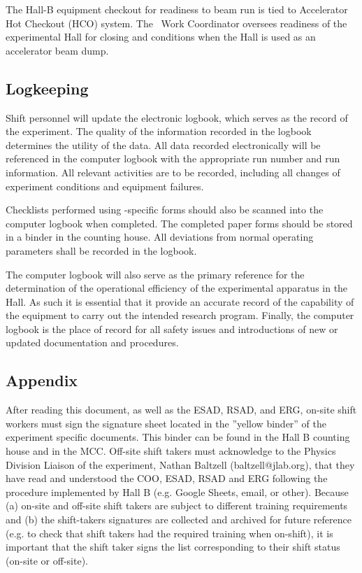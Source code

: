\documentclass[11pt]{article}
\begin{document}
The Hall-B equipment checkout for readiness to beam run
is tied to Accelerator Hot Checkout (HCO) system. 
The \HALL\ Work Coordinator oversees readiness of the experimental Hall for closing and 
conditions when the Hall is used as an accelerator beam dump. 

\subsection{Logkeeping}
\indent

Shift personnel will update the electronic
logbook, which serves as the record of the experiment. 
The quality of the information recorded in the logbook 
determines the utility of the data.
All data recorded electronically
will be referenced in the  computer 
logbook with the appropriate run number and run information. All 
relevant activities are to be recorded, including 
all changes of experiment conditions and equipment failures.

Checklists performed using \HALL-specific forms should also be scanned 
into the computer logbook when completed. The completed paper forms should 
be stored in a binder in the counting house.  All deviations from normal 
operating parameters shall  be recorded in the logbook. 

The computer logbook will also serve as the primary reference for the
determination of the operational efficiency of the experimental apparatus in
the Hall. As such it is essential that it provide an accurate record of the 
capability of the equipment to carry out the intended research program. 
Finally, the computer logbook is the place of record for all safety issues and 
introductions of new or updated documentation and procedures.

\begin{appendices}
\section{Appendix}
\indent
After reading this document, as well as the ESAD, RSAD, and ERG, on-site shift workers must sign the signature sheet located in the ”yellow binder” of the experiment specific documents. This binder can be found in the Hall B counting house and in the MCC. Off-site shift takers must acknowledge to the Physics Division Liaison of the experiment, Nathan Baltzell (baltzell@jlab.org), that they have read and understood the COO, ESAD, RSAD and ERG following the procedure implemented by Hall B (e.g. Google Sheets, email, or other). Because (a) on-site and off-site shift takers are subject to different training requirements and (b) the shift-takers signatures are collected and archived for future reference (e.g. to check that shift takers had the required training when on-shift), it is important that the shift taker signs the list corresponding to their shift status (on-site or off-site).
\end{appendices}
\end{document}
